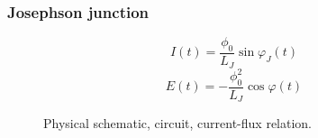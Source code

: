 \documentclass[10pt]{beamer}
\begin{document}

\begin{frame}
\frametitle{Josephson junction}
\vspace{3ex}

\begin{equation}
I(t) = \frac{\phi_0}{L_J} \sin{\varphi_J(t)}
\end{equation}
\begin{equation}
E(t) = -\frac{\phi_0^2}{L_J} \cos{\varphi(t)}
\end{equation}

\begin{figure}[H]
	\centering
	\caption{Physical schematic, circuit, current-flux relation.}
\end{figure}
\end{frame}

\end{document}
